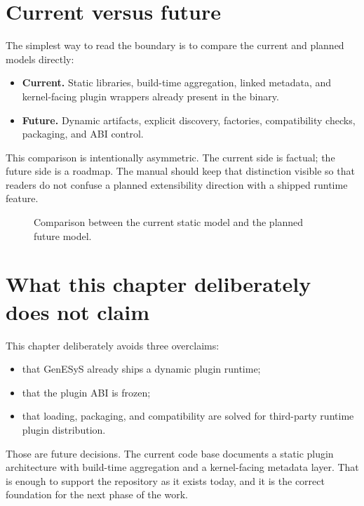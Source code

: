 \section{Current versus future}
\label{sec:plugin-current-vs-future}

The simplest way to read the boundary is to compare the current and planned
models directly:

\begin{itemize}
 \item \textbf{Current.} Static libraries, build-time aggregation, linked
   metadata, and kernel-facing plugin wrappers already present in the binary.
 \item \textbf{Future.} Dynamic artifacts, explicit discovery, factories,
   compatibility checks, packaging, and ABI control.
\end{itemize}

This comparison is intentionally asymmetric. The current side is factual; the
future side is a roadmap. The manual should keep that distinction visible so
that readers do not confuse a planned extensibility direction with a shipped
runtime feature.

\begin{figure}[htbp]
\caption{Comparison between the current static model and the planned future model.}
\label{fig:plugin-current-vs-future}
\end{figure}

\section{What this chapter deliberately does not claim}
\label{sec:plugin-does-not-claim}

This chapter deliberately avoids three overclaims:
\begin{itemize}
 \item that GenESyS already ships a dynamic plugin runtime;
 \item that the plugin ABI is frozen;
 \item that loading, packaging, and compatibility are solved for third-party
   runtime plugin distribution.
\end{itemize}

Those are future decisions. The current code base documents a static plugin
architecture with build-time aggregation and a kernel-facing metadata layer.
That is enough to support the repository as it exists today, and it is the
correct foundation for the next phase of the work.


